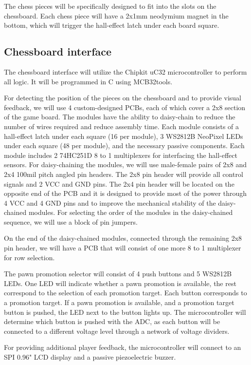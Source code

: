 \documentclass{article}
\begin{document}
The chess pieces will be specifically designed to fit into the slots on the chessboard. Each chess piece will have a 2x1mm neodymium magnet in the bottom, which will trigger the hall-effect latch under each board square.

\subsection*{Chessboard interface}

The chessboard interface will utilize the Chipkit uC32 microcontroller to perform all logic. It will be programmed in C using MCB32tools.

For detecting the position of the pieces on the chessboard and to provide visual feedback, we will use 4 custom-designed PCBs, each of which cover a 2x8 section of the game board. The modules have the ability to daisy-chain to reduce the number of wires required and reduce assembly time. Each module consists of a hall-effect latch under each square (16 per module), 3 WS2812B NeoPixel LEDs under each square (48 per module), and the necessary passive components. Each module includes 2 74HC251D 8 to 1 multiplexers for interfacing the hall-effect sensors. For daisy-chaining the modules, we will use male-female pairs of 2x8 and 2x4 100mil pitch angled pin headers. The 2x8 pin header will provide all control signals and 2 VCC and GND pins. The 2x4 pin header will be located on the opposite end of the PCB and it is designed to provide most of the power through 4 VCC and 4 GND pins and to improve the mechanical stability of the daisy-chained modules. For selecting the order of the modules in the daisy-chained sequence, we will use a block of pin jumpers.

On the end of the daisy-chained modules, connected through the remaining 2x8 pin header, we will have a PCB that will consist of one more 8 to 1 multiplexer for row selection.

The pawn promotion selector will consist of 4 push buttons and 5 WS2812B LEDs. One LED will indicate whether a pawn promotion is available, the rest correspond to the selection of each promotion target. Each button corresponds to a promotion target. If a pawn promotion is available, and a promotion target button is pushed, the LED next to the button lights up. The microcontroller will determine which button is pushed with the ADC, as each button will be connected to a different voltage level through a network of voltage dividers.

For providing additional player feedback, the microcontroller will connect to an SPI 0.96" LCD display and a passive piezoelectric buzzer.
\end{document}
